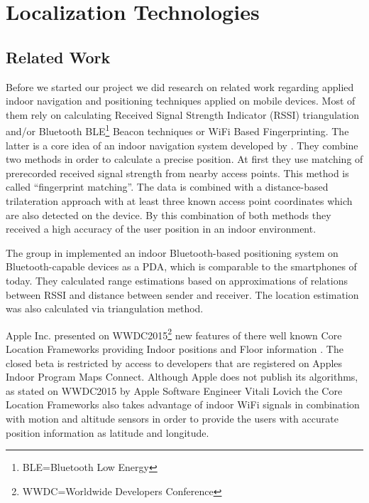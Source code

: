 \chapter{Localization Technologies}
\label{cha:relatedwork}

\section{Related Work}

Before we started our project we did research on related work regarding applied indoor navigation and positioning techniques applied on mobile devices. Most of them rely on calculating Received Signal Strength Indicator (RSSI) triangulation and/or Bluetooth BLE\footnote{BLE=Bluetooth Low Energy} Beacon techniques or WiFi Based Fingerprinting. The latter is a core idea of an indoor navigation system developed by \cite{ChaSo2012}. They combine two methods in order to calculate a precise position. At first they use matching of prerecorded received signal strength from nearby access points. This method is called \enquote{fingerprint matching}. The data is combined with a distance-based trilateration approach with at least three known access point coordinates which are also detected on the device. By this combination of both methods they received a high accuracy of the user position in an indoor environment.

The group in \cite{feldmann2003indoor} implemented an indoor Bluetooth-based positioning system on Bluetooth-capable devices as a PDA, which is comparable to the smartphones of today. They calculated range estimations based on approximations of relations between RSSI and distance between sender and receiver. The location estimation was also calculated via triangulation method.

Apple Inc. presented on WWDC2015\footnote{WWDC=Worldwide Developers Conference} new features of there well known Core Location Frameworks providing Indoor positions and Floor information \cite{wwdc15}. The closed beta is restricted by access to developers that are registered on Apples Indoor Program Maps Connect. Although Apple does not publish its algorithms, as stated on WWDC2015 by Apple Software Engineer Vitali Lovich the Core Location Frameworks also takes advantage of indoor WiFi signals in combination with motion and altitude sensors in order to provide the users with accurate position information as latitude and longitude.

